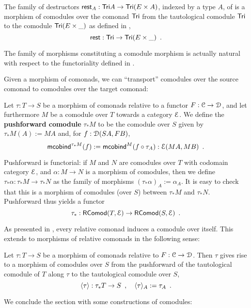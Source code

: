 \documentclass[a4paper,USenglish]{lipics}
\newcommand{\fat}[1]{\textbf{#1}}
\begin{document}
\begin{ex}\label{ex:tail_comodule}
 The family of destructors $\tail_A : \Tri A \to \Tri(E\times A)$, indexed by a type $A$, of  is a morphism of comodules over the comonad $\Tri$ 
  from the tautological comodule  $\Tri$ to the comodule $\Tri(E\times \_)$ as defined in ,
  \[ \tail : \Tri \to \Tri(E\times \_) \enspace . \]
\end{ex}




\begin{rem}
  The family of morphisms constituting a comodule morphism is actually natural with respect to the functoriality 
  defined in .
\end{rem}

Given a morphism of comonads, we can \enquote{transport} comodules over the source comonad to comodules over the target comonad:


\begin{defn}
\label{def:pushforward_comodule} 
  Let $\tau : T\to S$ be a morphism of comonads relative to a functor $F : \C \to \D$, and let furthermore $M$ be a 
  comodule over $T$ towards a category $\E$. We define the \fat{pushforward comodule} $\tau_*M$ to be the comodule over $S$ given by
  $  \tau_*M(A) := MA $
  and, for $f : \D(SA,FB)$,
   \[ \mcobind^{\tau_*M}(f) := \mcobind^M(\comp{\tau_A}{f}) : \E(MA,MB) \enspace . \]
   
  \noindent
  Pushforward is functorial: if $M$ and $N$ are comodules over $T$ with codomain category $\E$, and $\alpha : M\to N$ is 
    a morphism of comodules, then we define 
     $\tau_*\alpha : \tau_*M \to \tau_*N$
    as the family of morphisms
     $ (\tau_*\alpha)_A := \alpha_A$.
  It is easy to check that this is a morphism of comodules (over $S$) between $\tau_*M$ and $\tau_*N$.
  Pushforward thus yields a functor \[\tau_*:\RComod(T,\E) \to \RComod(S,\E) \enspace . \]
\end{defn}


As presented in , every relative comonad induces a comodule over itself.
This extends to morphisms of relative comonads in the following sense:

\begin{defn}%
\label{def:induced} 
  Let $\tau : T\to S$ be a morphism of comonads relative to $F : \C \to \D$.
  Then $\tau$ gives rise to a morphism of comodules over $S$ from the pushforward of the tautological comodule
  of $T$ along $\tau$ to the tautological comodule over $S$,
  \[ \induced{\tau} : \tau_*T \to S \enspace , \quad \induced{\tau}_A := \tau_A \enspace . \]
\end{defn}
% 
We conclude the section with some constructions of comodules:
\end{document}
